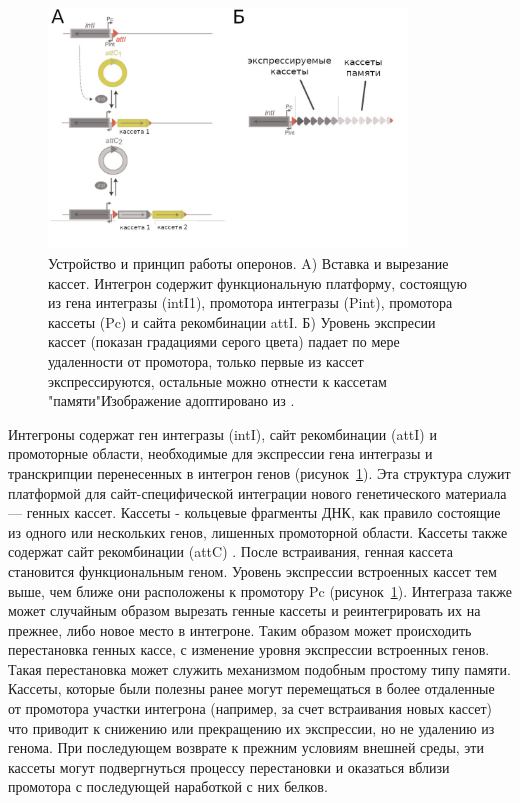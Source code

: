\begin{figure}[!ht] 
  \center
  \includegraphics [width=0.85\textwidth] {Dissertation/images/lit/integron.jpg}
  \caption{Устройство и принцип работы оперонов. A) Вставка и вырезание кассет. Интегрон содержит функциональную платформу, состоящую из гена интегразы (intI1), промотора интегразы (Pint), промотора кассеты (Pc) и сайта рекомбинации attI. Б) Уровень экспресии кассет (показан градациями серого цвета) падает по мере удаленности от промотора, только первые из кассет экспрессируются, остальные можно отнести к кассетам "памяти"\. Изображение адоптировано из \cite{boyd2009genomic}.} 
  \label{img:integron}  
\end{figure}

Интегроны содержат ген интегразы (intI), сайт рекомбинации (attI) и промоторные области, необходимые для экспрессии гена интегразы и транскрипции перенесенных в интегрон генов (рисунок~\ref{img:integron}). Эта структура служит платформой для сайт-специфической интеграции нового генетического материала --- генных кассет. Кассеты - кольцевые фрагменты ДНК, как правило состоящие из одного или нескольких генов, лишенных промоторной области. Кассеты также содержат сайт рекомбинации (attC) \cite{gillings2014integrons}. После встраивания, генная кассета становится функциональным геном. Уровень экспрессии встроенных кассет тем выше, чем ближе они расположены к промотору Pc (рисунок~\ref{img:integron}). Интеграза также может случайным образом вырезать генные кассеты и реинтегрировать их на прежнее, либо новое место в интегроне. Таким образом может происходить перестановка генных кассе, с изменение уровня экспрессии встроенных генов. Такая перестановка может служить механизмом подобным простому типу памяти. Кассеты, которые были полезны ранее могут перемещаться в более отдаленные от промотора участки интегрона (например, за счет встраивания новых кассет) что приводит к снижению или прекращению их экспрессии, но не удалению из генома. При последующем возврате к прежним условиям внешней среды, эти кассеты могут подвергнуться процессу перестановки и оказаться вблизи промотора с последующей наработкой с них белков.   

